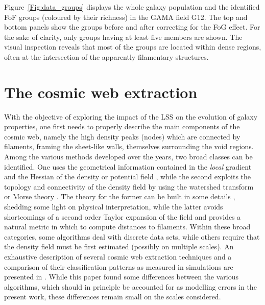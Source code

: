 \documentclass[useAMS,usenatbib]{mnras}
\newcommand{\fof}{FoF\xspace}
\newcommand{\fog}{FoG\xspace}
\begin{document}
Figure~\ref{Fig:data_groups} displays the whole galaxy population and the identified \fof groups (coloured by their richness) in the GAMA field G12. The top and bottom panels show the groups before and after  correcting for the \fog effect. For the sake of clarity, only groups having at least five members are shown. The visual inspection reveals that most of the groups are located within dense regions, often at the intersection of the %
apparently filamentary structures.


\section{The cosmic web extraction}
\label{sec:methods}
With the objective of exploring the impact of the LSS on the evolution of galaxy properties, one first needs to properly describe the main components of the cosmic web, namely the high density peaks (nodes) which are connected by filaments, framing the sheet-like walls, themselves surrounding the void regions.
Among the various methods developed over the years, two broad classes can be identified. 
One uses the geometrical information contained in the {\it local} gradient and the Hessian %
of the density or potential field \citep[e.g.][]{Novikov2006, AragonCalvo2007b,AragonCalvo2007a,Hahn2007a,Hahn2007b,Sousbie2008a,Sousbie2008b,Forero-Romero2009,Bond2010b,Bond2010a}, while the second exploits the topology and connectivity of the density field  by using the  watershed transform \citep[]{AragonCalvo2010b} or  Morse theory \citep[e.g.][]{Colombi2000, Sousbie2008a,Sousbie2011a}. 
The theory for the former can be built in some details \citep[see e.g.][]{Pogosyan2009}, shedding some light on  physical interpretation,
while the latter avoids shortcomings of a second order Taylor expansion of the field and provides a natural metric in which to compute distances to filaments.
Within these broad categories, some algorithms deal with discrete data sets, while others %
require that the density field must be first estimated (possibly on multiple scales).
An exhaustive description of several cosmic web extraction techniques and a comparison of their classification patterns as measured in simulations are presented in \cite{Libeskind2017}. While this paper found some differences between the various algorithms, which should 
in principle be accounted for as modelling errors in the present work, these differences remain small on the scales considered. 
\end{document}
